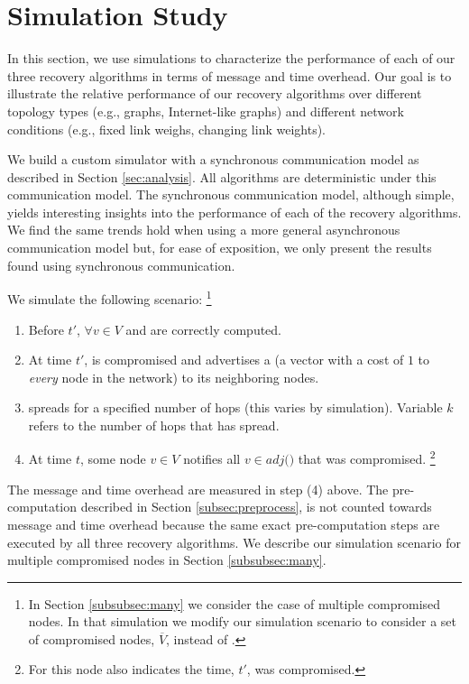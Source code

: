 \section{Simulation Study}
\label{sec:eval}

In this section, we use simulations to characterize the performance of each of our three recovery algorithms in terms of message and time overhead. 
Our goal is to illustrate the relative performance of our recovery algorithms over different topology types (e.g., \er graphs, Internet-like graphs) and
different network conditions (e.g., fixed link weighs, changing link weights).


We build a custom simulator with a synchronous communication model as described in Section \ref{sec:analysis}. All algorithms
are deterministic under this communication model. The synchronous communication model, although simple, yields interesting insights into the performance of each of the recovery algorithms.
We find the same trends hold when using a more general asynchronous communication model but, for ease of exposition, we only present the results found using synchronous communication.


We simulate the following scenario: 
{\footnote {\small In Section \ref{subsubsec:many} we consider the case of multiple compromised nodes.  In that simulation we modify our simulation scenario
to consider a set of compromised nodes, $\overline{V}$, instead of \bads.}}
\begin{enumerate}
	\item Before $t'$, $\forall v \in V$ \minvv and \dmatrixv are correctly computed.

	\item At time $t'$, \bad is compromised and advertises a \badvector (a vector with a cost of $1$ to \emph{every} node in the network) to its neighboring nodes.

	\item \badvector spreads for a specified number of hops (this varies by simulation).  Variable $k$ refers to the number of hops that \badvector has spread.

	\item At time $t$, some node $v \in V$ notifies all $v \in adj($\bads$)$ that \bad was compromised. 
	{\footnote { \small For \cpr this node also indicates the time, $t'$, \bad was compromised.}} 

\end{enumerate}
The message and time overhead are measured in step (4) above. The pre-computation described in Section \ref{subsec:preprocess},
is not counted towards message and time overhead because the same exact pre-computation steps are executed by all three recovery algorithms. 
We describe our simulation scenario for multiple compromised nodes in Section \ref{subsubsec:many}.



